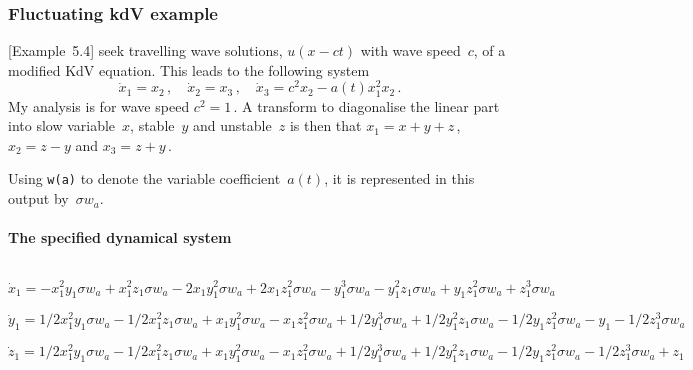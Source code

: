 \documentclass[11pt,a5paper]{article}
\begin{document}
\subsubsection{Fluctuating kdV example}

\cite{Potzsche2006} [Example~5.4] seek travelling wave solutions, $u(x-ct)$ with wave speed~$c$, of a modified KdV equation.  
This leads to the following system 
\begin{equation*}
\dot x_1=x_2\,,\quad
\dot x_2=x_3\,,\quad
\dot x_3=c^2x_2-a(t)x_1^2x_2\,.
\end{equation*}
My analysis is for wave speed $c^2=1$\,.
A transform to diagonalise the linear part into slow variable~$x$, stable~$y$ and unstable~$z$ is then that $x_1=x+y+z$\,, $x_2=z-y$ and $x_3=z+y$\,.

Using \verb|w(a)| to denote the variable coefficient~$a(t)$, it is represented in this output by~$\sigma w_a$.

\paragraph{The specified dynamical system}
\begin{math}
\end{math}\par

\begin{math}
\dot x_{1}=-x_{1}^{2} y_{1} \sigma  w_{a}+x_{1}^{2} z_{1} \sigma  w_{a}-
2 x_{1} y_{1}^{2} \sigma  w_{a}+2 x_{1} z_{1}^{2} \sigma  w_{a}-y_{1}^{3
} \sigma  w_{a}-y_{1}^{2} z_{1} \sigma  w_{a}+y_{1} z_{1}^{2} \sigma  w_
{a}+z_{1}^{3} \sigma  w_{a}
\end{math}\par

\begin{math}
\dot y_{1}=1/2 x_{1}^{2} y_{1} \sigma  w_{a}-1/2 x_{1}^{2} z_{1} \sigma 
 w_{a}+x_{1} y_{1}^{2} \sigma  w_{a}-x_{1} z_{1}^{2} \sigma  w_{a}+1/2 y
_{1}^{3} \sigma  w_{a}+1/2 y_{1}^{2} z_{1} \sigma  w_{a}-1/2 y_{1} z_{1}
^{2} \sigma  w_{a}-y_{1}-1/2 z_{1}^{3} \sigma  w_{a}
\end{math}\par

\begin{math}
\dot z_{1}=1/2 x_{1}^{2} y_{1} \sigma  w_{a}-1/2 x_{1}^{2} z_{1} \sigma 
 w_{a}+x_{1} y_{1}^{2} \sigma  w_{a}-x_{1} z_{1}^{2} \sigma  w_{a}+1/2 y
_{1}^{3} \sigma  w_{a}+1/2 y_{1}^{2} z_{1} \sigma  w_{a}-1/2 y_{1} z_{1}
^{2} \sigma  w_{a}-1/2 z_{1}^{3} \sigma  w_{a}+z_{1}
\end{math}\par
\end{document}
